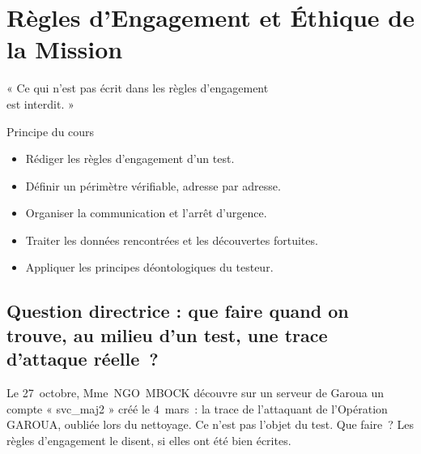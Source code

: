 
\chapter{Règles d'Engagement et Éthique de la Mission}
\label{chap:engagement}

\epigraph{%
    « Ce qui n'est pas écrit dans les règles d'engagement\\
    est interdit. »%
}{Principe du cours}


\begin{boxobjectifs}
\begin{itemize}
    \item Rédiger les règles d'engagement d'un test.
    \item Définir un périmètre vérifiable, adresse par adresse.
    \item Organiser la communication et l'arrêt d'urgence.
    \item Traiter les données rencontrées et les découvertes fortuites.
    \item Appliquer les principes déontologiques du testeur.
\end{itemize}
\end{boxobjectifs}

\bigskip

\section*{Question directrice : que faire quand on trouve, au milieu d'un test, une trace d'attaque réelle~?}

Le 27~octobre, Mme~NGO~MBOCK découvre sur un serveur de Garoua un compte
« svc\_maj2 » créé le 4~mars~: la trace de l'attaquant de l'Opération
GAROUA, oubliée lors du nettoyage. Ce n'est pas l'objet du test. Que
faire~? Les règles d'engagement le disent, si elles ont été bien écrites.

